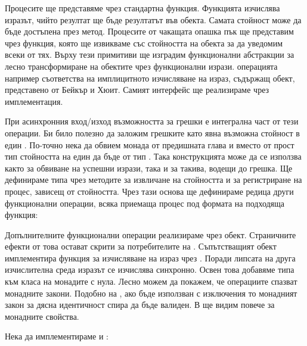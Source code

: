 Процесите ще представяме чрез стандартна функция. Функцията изчислява изразът, чийто резултат ще бъде резултатът във  обекта. Самата стойност може да бъде достъпена през  метод. Процесите от чакащата опашка пък ще представим чрез  функция, която ще извикваме със стойността на  обекта за да уведомим всеки от тях. Върху тези примитиви ще изградим функционални абстракции за лесно трансформиране на  обектите чрез функционални изрази.  операцията например съответства на имплицитното изчисляване на израз, съдържащ  обект, представено от Бейкър и Хюит. Самият  интерфейс ще реализираме чрез  имплементация.

При асинхронния вход/изход възможността за грешки е интегрална част от тези операции. Би било полезно да заложим грешките като явна възможна стойност в един . По-точно нека да обвием  монада от предишната глава и вместо от прост тип  стойността на един  да бъде от тип . Така  конструкцията може да се използва както за обвиване на успешни изрази, така и за такива, водещи до грешка. Ще дефинираме типа  чрез методите  за извличане на стойността и  за регистриране на процес, зависещ от стойността. Чрез тази основа ще дефинираме редица други функционални операции, всяка приемаща процес под формата на подходяща функция:



Допълнителните функционални операции реализираме чрез  обект. Страничните ефекти от това остават скрити за потребителите на . Съпътстващият обект имплементира функция за изчисляване на израз чрез . Поради липсата на друга изчислителна среда изразът се изчислява синхронно. Освен това добавяме типа  към класа на монадите с нула. Лесно можем да покажем, че операциите спазват монадните закони. Подобно на , ако  бъде използван с изключения то монадният закон за дясна идентичност спира да бъде валиден. В  ще видим повече за монадните свойства.

Нека да имплементираме и :

